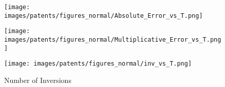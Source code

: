 \begin{figure*}[htbp]
	\ContinuedFloat
	\centering
	\begin{subfigure}[b]{\textwidth}
		\centering
			
		\begin{minipage}[b]{0.05\textwidth}
			\centering
		\end{minipage}%
		\begin{minipage}[b]{0.3\textwidth}
			\centering
			\caption*{Global Error} %
			\texttt{[image: images/patents/figures\_normal/Absolute\_Error\_vs\_T.png]} %
			
		\end{minipage}%
		\begin{minipage}[b]{0.3\textwidth}
			\centering
			\caption*{Local Error} %
			\texttt{[image: images/patents/figures\_normal/Multiplicative\_Error\_vs\_T.png]} %
			
		\end{minipage}%
		\begin{minipage}[b]{0.3\textwidth}
			\centering
			\caption*{Number of Inversions} %
			\texttt{[image: images/patents/figures\_normal/inv\_vs\_T.png]} %
		\end{minipage}
		

\end{subfigure}
\end{figure*}
